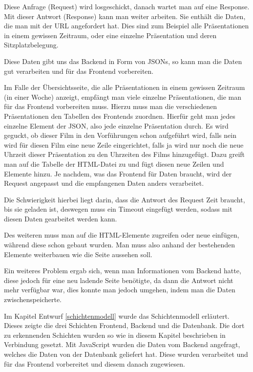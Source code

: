 	Diese Anfrage (Request) wird losgeschickt, danach wartet man auf eine Response. Mit dieser Antwort (Response) kann man weiter arbeiten. Sie enthält die Daten, die man mit der \ac{URL} angefordert hat. Dies sind zum Beispiel alle Präsentationen in einem gewissen Zeitraum, oder eine einzelne Präsentation und deren Sitzplatzbelegung.

	Diese Daten gibt uns das Backend in Form von JSONs, so kann man die Daten gut verarbeiten und für das Frontend vorbereiten. 

	
	Im Falle der Übersichtsseite, die alle Präsentationen in einem gewissen Zeitraum (in einer Woche) anzeigt, empfängt man viele einzelne Präsentationen, die man für das Frontend vorbereiten muss. Hierzu muss man die verschiedenen Präsentationen den Tabellen des Frontends zuordnen. Hierfür geht man jedes einzelne Element der JSON, also jede einzelne Präsentation durch. Es wird geguckt, ob dieser Film in den Vorführungen schon aufgeführt wird, falls nein wird für diesen Film eine neue Zeile eingerichtet, falls ja wird nur noch die neue Uhrzeit dieser Präsentation zu den Uhrzeiten des Films hinzugefügt. Dazu greift man auf die Tabelle der \ac{HTML}-Datei zu und fügt diesen neue Zeilen und Elemente hinzu. Je nachdem, was das Frontend für Daten braucht, wird der Request angepasst und die empfangenen Daten anders verarbeitet.
	
	Die Schwierigkeit hierbei liegt darin, dass die Antwort des Request Zeit braucht, bis sie geladen ist, deswegen muss ein Timeout eingefügt werden, sodass mit diesen Daten gearbeitet werden kann.

	Des weiteren muss man auf die \ac{HTML}-Elemente zugreifen oder neue einfügen, während diese schon gebaut wurden. Man muss also anhand der bestehenden Elemente weiterbauen wie die Seite aussehen soll.

	Ein weiteres Problem ergab sich, wenn man Informationen vom Backend hatte, diese jedoch für eine neu ladende Seite benötigte, da dann die Antwort nicht mehr verfügbar war, dies konnte man jedoch umgehen, indem man die Daten zwischenspeicherte.

	

	
	Im Kapitel Entwurf \vref{schichtenmodell} wurde das Schichtenmodell erläutert. Dieses zeigte die drei Schichten Frontend, Backend und die Datenbank. Die dort zu erkennenden Schichten wurden so wie in diesem Kapitel beschrieben in Verbindung gesetzt. Mit JavaScript wurden die Daten vom Backend angefragt, welches die Daten von der Datenbank geliefert hat. Diese wurden verarbeitet und für das Frontend vorbereitet und diesem danach zugewiesen.
	
